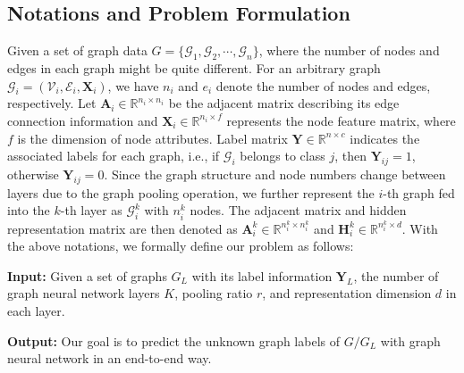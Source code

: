 \documentclass[letterpaper]{article} \usepackage{aaai20}  \usepackage{times}  \usepackage{helvet} \usepackage{courier}  \usepackage[hyphens]{url}  \usepackage{graphicx} \urlstyle{rm} \def\UrlFont{\rm}  \usepackage{graphicx}  \frenchspacing  \setlength{\pdfpagewidth}{8.5in}  \setlength{\pdfpageheight}{11in}
\begin{document}
\subsection{Notations and Problem Formulation}
Given a set of graph data $G = \{\mathcal{G}_1, \mathcal{G}_2, \cdots, \mathcal{G}_n\}$, where the number of nodes and edges in each graph might be quite different. For an arbitrary graph $\mathcal{G}_i = (\mathcal{V}_i, \mathcal{E}_i, \mathbf{X}_i)$, we have $n_i$ and $e_i$ denote the number of nodes and edges, respectively. Let $\mathbf{A}_i \in \mathbb{R}^{n_i \times n_i}$ be the adjacent matrix describing its edge connection information and $\mathbf{X}_i \in \mathbb{R}^{n_i \times f}$ represents the node feature matrix, where $f$ is the dimension of node attributes. Label matrix $\mathbf{Y} \in \mathbb{R}^{n \times c}$ indicates the associated labels for each graph, i.e., if $\mathcal{G}_i$ belongs to class $j$, then $\mathbf{Y}_{ij} = 1$, otherwise $\mathbf{Y}_{ij} = 0$. Since the graph structure and node numbers change between layers due to the graph pooling operation, we further represent the $i$-th graph fed into the $k$-th layer as $\mathcal{G}_i^{k}$ with $n_i^k$ nodes. The adjacent matrix and hidden representation matrix are then denoted as $\mathbf{A}_i^k \in \mathbb{R}^{n_i^k \times n_i^k}$ and $\mathbf{H}_i^k \in \mathbb{R}^{n_i^k \times d}$. With the above notations, we formally define our problem as follows:

\textbf{Input:}
Given a set of graphs $G_L$ with its label information $\mathbf{Y}_L$, the number of graph neural network layers $K$, pooling ratio $r$, and representation dimension $d$ in each layer.

\textbf{Output:} Our goal is to predict the unknown graph labels of $G/G_L$ with graph neural network in an end-to-end way.
\end{document}
